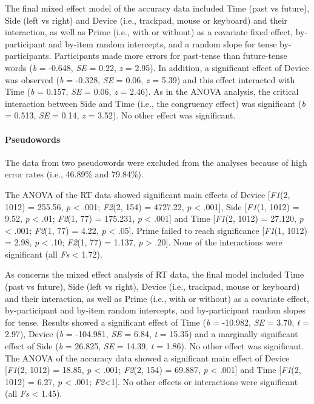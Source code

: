 \documentclass[
  a4paper,12pt,twoside,onecolumn,openright,final,oldfontcommands]{memoir}
\begin{document}
The final mixed effect model of the accuracy data included Time (past vs future), Side (left vs right) and Device (i.e., trackpad, mouse or keyboard) and their interaction, as well as Prime (i.e., with or without) as a covariate fixed effect, by-participant and by-item random intercepts, and a random slope for tense by-participants. Participants made more errors for past-tense than future-tense words (\emph{b} = -0.648, \emph{SE} = 0.22, \emph{z} = 2.95). In addition, a significant effect of Device was observed (\emph{b} = -0.328, \emph{SE} = 0.06, \emph{z} = 5.39) and this effect interacted with Time (\emph{b} = 0.157, \emph{SE} = 0.06, \emph{z} = 2.46). As in the ANOVA analysis, the critical interaction between Side and Time (i.e., the congruency effect) was significant (\emph{b} = 0.513, \emph{SE} = 0.14, \emph{z} = 3.52). No other effect was significant.

\hypertarget{pseudowords-1}{%
\paragraph{Pseudowords}\label{pseudowords-1}}

The data from two pseudowords were excluded from the analyses because of high error rates (i.e., 46.89\% and 79.84\%).

The ANOVA of the RT data showed significant main effects of Device {[}\emph{F1}(2, 1012) = 255.56, \emph{p} \textless{} .001; \emph{F2}(2, 154) = 4727.22, \emph{p} \textless{} .001{]}, Side {[}\emph{F1}(1, 1012) = 9.52, \emph{p} \textless{} .01; \emph{F2}(1, 77) = 175.231, \emph{p} \textless{} .001{]} and Time {[}\emph{F1}(2, 1012) = 27.120, \emph{p} \textless{} .001; \emph{F2}(1, 77) = 4.22, \emph{p} \textless{} .05{]}. Prime failed to reach significance {[}\emph{F1}(1, 1012) = 2.98, \emph{p} \textless{} .10; \emph{F2}(1, 77) = 1.137, \emph{p} \textgreater{} .20{]}. None of the interactions were significant (all \emph{Fs} \textless{} 1.72).

As concerns the mixed effect analysis of RT data, the final model included Time (past vs future), Side (left vs right), Device (i.e., trackpad, mouse or keyboard) and their interaction, as well as Prime (i.e., with or without) as a covariate effect, by-participant and by-item random intercepts, and by-participant random slopes for tense. Results showed a significant effect of Time (\emph{b} = -10.982, \emph{SE} = 3.70, \emph{t} = 2.97), Device (\emph{b} = -104.981, \emph{SE} = 6.84, \emph{t} = 15.35) and a marginally significant effect of Side (\emph{b} = 26.825, \emph{SE} = 14.39, \emph{t} = 1.86). No other effect was significant.
The ANOVA of the accuracy data showed a significant main effect of Device {[}\emph{F1}(2, 1012) = 18.85, \emph{p} \textless{} .001; \emph{F2}(2, 154) = 69.887, \emph{p} \textless{} .001{]} and Time {[}\emph{F1}(2, 1012) = 6.27, \emph{p} \textless{} .001; \emph{F2}\textless1{]}. No other effects or interactions were significant (all \emph{Fs} \textless{} 1.45).
\end{document}
